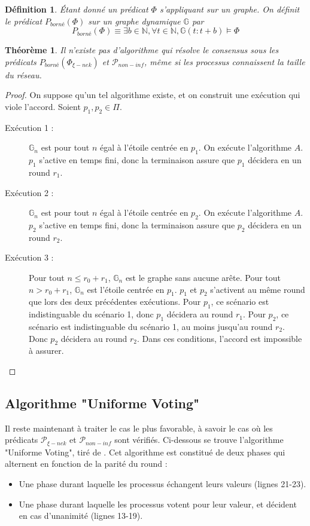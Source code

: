 \documentclass{article}
\newtheorem{theorem}{Théorème}
\newtheorem{definition}{Définition}
\begin{document}
\begin{definition}
	Étant donné un prédicat $\Phi$ s'appliquant sur un graphe.
	On définit le prédicat $P_{borné}(\Phi)$ sur un graphe dynamique
	$\mathds{G}$ par $$P_{borné}(\Phi) \equiv \exists b \in \mathds{N}, \forall t \in \mathds{N}, \mathds{G}(t:t+b) \models \Phi$$
\end{definition}

\begin{theorem}
	Il n'existe pas d'algorithme qui résolve le consensus sous les prédicats $P_{borné}(\Phi_{\xi-nek})$ et $\mathcal{P}_{non-inf}$, même si les processus connaissent la taille du réseau.
\end{theorem}
\begin{proof}
	On suppose qu'un tel algorithme existe, et on construit une exécution qui viole l'accord.
	Soient $p_1, p_2 \in \Pi$.
	\begin{description}

		\item[Exécution 1 :] $\mathds{G}_n$ est pour tout $n$ égal à l'étoile centrée en $p_1$. On exécute l'algorithme $A$.
			$p_1$ s'active en temps fini, donc la terminaison assure que $p_1$ décidera en un round $r_1$.
		\item[Exécution 2 :] $\mathds{G}_n$ est pour tout $n$ égal à l'étoile centrée en $p_2$. On exécute l'algorithme $A$.
			$p_2$ s'active en temps fini, donc la terminaison assure que $p_2$ décidera en un round $r_2$.
		\item[Exécution 3 :] Pour tout $n \leq r_0 + r_1$, $\mathds{G}_n$ est le graphe sans aucune arête. Pour tout $n > r_0 + r_1$, $\mathds{G}_n$ est l'étoile centrée en $p_1$.
			$p_1$ et $p_2$ s'activent au même round que lors des deux précédentes exécutions.
			Pour $p_1$, ce scénario est indistinguable du scénario 1, donc $p_1$ décidera au round $r_1$.
			Pour $p_2$, ce scénario est indistinguable du scénario 1, au moins jusqu'au round $r_2$. Donc $p_2$ décidera au round $r_2$.
			Dans ces conditions, l'accord est impossible à assurer.

	\end{description}
\end{proof}

\subsection{Algorithme "Uniforme Voting"}

Il reste maintenant à traiter le cas le plus favorable, à savoir le cas où les prédicats $\mathcal{P}_{\xi-nek}$ et $\mathcal{P}_{non-inf}$ sont vérifiés.
Ci-dessous se trouve l'algorithme "Uniforme Voting", tiré de \cite{model_ho}.
Cet algorithme est constitué de deux phases qui alternent en fonction de la parité du round :
\begin{itemize}
	\item Une phase durant laquelle les processus échangent leurs valeurs (lignes 21-23).
	\item Une phase durant laquelle les processus votent pour leur valeur, et décident en cas d'unanimité (lignes 13-19).
\end{itemize}
\end{document}
